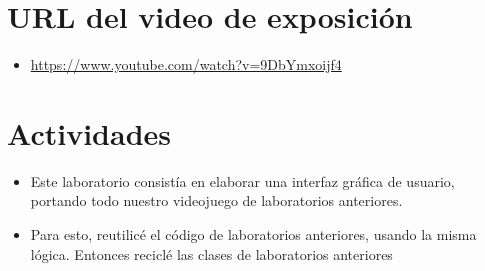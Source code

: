 \documentclass{article}
\begin{document}
	\section{URL del video de exposición}
	\begin{itemize}
		\item \url{ https://www.youtube.com/watch?v=9DbYmxoijf4}
	\end{itemize}
	
	\section{Actividades}
	\begin{itemize}	
		\item Este laboratorio consistía en elaborar una interfaz gráfica de usuario, portando todo nuestro videojuego de laboratorios anteriores.
		\item Para esto, reutilicé el código de laboratorios anteriores, usando la misma lógica. Entonces reciclé las clases de laboratorios anteriores
	\end{itemize}	
\end{document}

